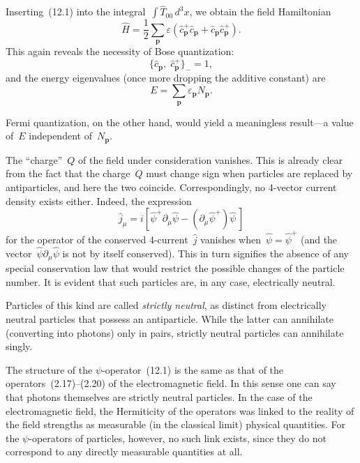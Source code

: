 Inserting~(12.1) into the integral~$\int\hat{T}_{00}\,d^3x$, we obtain the field Hamiltonian
\begin{equation}
\hat{H} = \frac{1}{2}\sum_\mathbf{p} \varepsilon(\hat{c}^+_\mathbf{p}\hat{c}_\mathbf{p} + \hat{c}_\mathbf{p}\hat{c}^+_\mathbf{p}).
\tag{12.5}
\end{equation}
This again reveals the necessity of Bose quantization:
\begin{equation}
\{\hat{c}_\mathbf{p},\; \hat{c}^+_\mathbf{p}\}_- = 1,
\tag{12.6}
\end{equation}
and the energy eigenvalues (once more dropping the additive constant) are
\begin{equation}
E = \sum_\mathbf{p} \varepsilon_\mathbf{p} N_\mathbf{p}.
\tag{12.7}
\end{equation}

Fermi quantization, on the other hand, would yield a meaningless result---a value of~$E$ independent of~$N_\mathbf{p}$.

The ``charge''~$Q$ of the field under consideration vanishes. This is already clear from the fact that the charge~$Q$ must change sign when particles are replaced by antiparticles, and here the two coincide. Correspondingly, no 4-vector current density exists either. Indeed, the expression
\begin{equation}
\hat{j}_\mu = i[\hat{\psi}^+\partial_\mu\hat{\psi} - (\partial_\mu\hat{\psi}^+)\hat{\psi}\,]
\tag{12.8}
\end{equation}
for the operator of the conserved 4-current~$\hat{j}$ vanishes when~$\hat{\psi} = \hat{\psi}^+$ (and the vector~$\hat{\psi}\partial_\mu\hat{\psi}$ is not by itself conserved). This in turn signifies the absence of any special conservation law that would restrict the possible changes of the particle number. It is evident that such particles are, in any case, electrically neutral.

Particles of this kind are called \emph{strictly neutral}, as distinct from electrically neutral particles that possess an antiparticle. While the latter can annihilate (converting into photons) only in pairs, strictly neutral particles can annihilate singly.

The structure of the $\psi$-operator~(12.1) is the same as that of the operators~(2.17)--(2.20) of the electromagnetic field. In this sense one can say that photons themselves are strictly neutral particles. In the case of the electromagnetic field, the Hermiticity of the operators was linked to the reality of the field strengths as measurable (in the classical limit) physical quantities. For the $\psi$-operators of particles, however, no such link exists, since they do not correspond to any directly measurable quantities at all.


